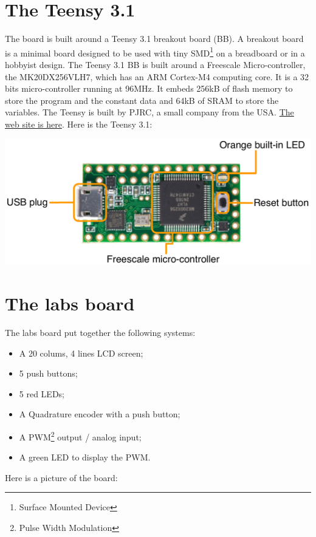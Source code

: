 \documentclass[11pt]{report}
\begin{document}
\section{The Teensy 3.1}
\label{teensy}

The board is built around a Teensy 3.1 breakout board (BB). A breakout board is a minimal board designed to be used with tiny SMD\footnote{Surface Mounted Device} on a breadboard or in a hobbyist design. The Teensy 3.1 BB is built around a Freescale Micro-controller, the MK20DX256VLH7, which has an ARM Cortex-M4 computing core. It is a 32 bits micro-controller running at 96MHz. It embeds 256kB of flash memory to store the program and the constant data and 64kB of SRAM to store the variables. The Teensy is built by PJRC, a small company from the USA. \href{https://www.pjrc.com/teensy/teensy31.html}{The web site is here}. Here is the Teensy 3.1:

\begin{center}
   \includegraphics[scale=0.5]{teensy31.pdf}
\end{center}

\section{The labs board}

The labs board put together the following systems:
\begin{itemize}
\item A 20 colums, 4 lines LCD screen;
\item 5 push buttons;
\item 5 red LEDs;
\item A Quadrature encoder with a push button;
\item A PWM\footnote{Pulse Width Modulation} output / analog input;
\item A green LED to display the PWM.
\end{itemize}

Here is a picture of the board:
\end{document}

